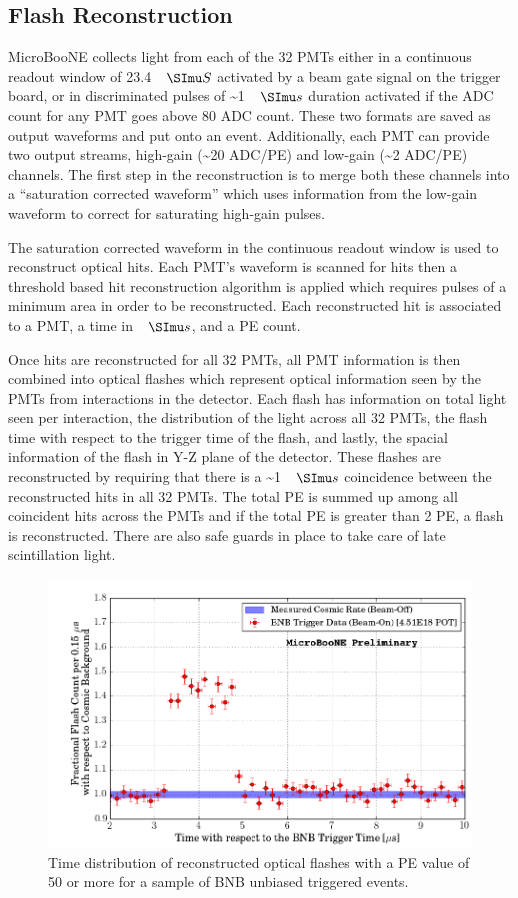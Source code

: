 \subsection{Flash Reconstruction}
MicroBooNE collects light from each of the 32 PMTs either in a continuous readout window of 23.4 $\micro S$ activated by a beam gate signal on the trigger board, or in discriminated pulses of \sim 1 $\micro s$ duration activated if the ADC count for any PMT goes above 80 ADC count. These two formats are saved as output waveforms and put onto an event. Additionally, each PMT can provide two output streams, high-gain (\sim 20 ADC/PE) and low-gain (\sim 2 ADC/PE) channels. The first step in the reconstruction is to merge both these channels into a ``saturation corrected waveform'' which uses information from the low-gain waveform to correct for saturating high-gain pulses.
 
The saturation corrected waveform in the continuous readout window is used to reconstruct optical hits. Each PMT's waveform is scanned for hits then a threshold based hit reconstruction algorithm is applied which requires pulses of a minimum area in order to be reconstructed. Each reconstructed hit is associated to a PMT, a time in $\micro s$, and a PE count. 

Once hits are reconstructed for all 32 PMTs, all PMT information is then combined into optical flashes which represent optical information seen by the PMTs from interactions in the detector. Each flash has information on total light seen per interaction,  the distribution of the light across all 32 PMTs, the flash time with respect to the trigger time of the flash, and lastly, the spacial information of the flash in Y-Z plane of the detector. These flashes are reconstructed by requiring that there is a \sim 1 $\micro s$ coincidence between the reconstructed hits in all 32 PMTs. The total PE is summed up among all coincident hits across the PMTs and if the total PE is greater than 2 PE, a flash is reconstructed. There are also safe guards in place to take care of late scintillation light.  

\begin{figure}[htp!]
\includegraphics[width=.6\textwidth]{figs/opticaltrigger.png}
\caption{Time distribution of reconstructed optical flashes with a PE value of 50 or more for a sample of BNB unbiased triggered events.}
\label{fig:optrig}
\end{figure}

